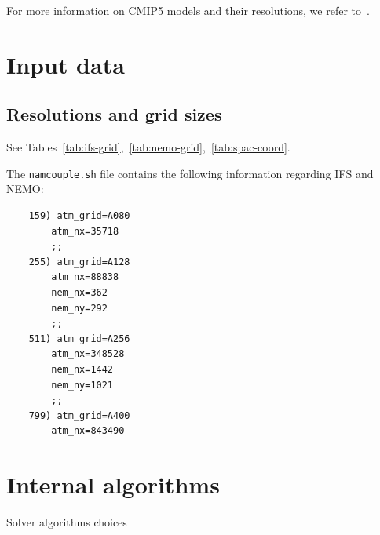For more information on CMIP5 models and their resolutions, we refer to~\cite{cmip5}.

\section{Input data}

\subsection{Resolutions and grid sizes}
See Tables~\ref{tab:ifs-grid},~\ref{tab:nemo-grid},~\ref{tab:spac-coord}.


The \texttt{namcouple.sh} file contains the following information regarding IFS and NEMO:

\begin{lstlisting}
    159) atm_grid=A080
        atm_nx=35718
        ;;
    255) atm_grid=A128
        atm_nx=88838
        nem_nx=362
        nem_ny=292
        ;;
    511) atm_grid=A256
        atm_nx=348528
        nem_nx=1442
        nem_ny=1021
        ;;
    799) atm_grid=A400
        atm_nx=843490  
\end{lstlisting}








\section{Internal algorithms}
Solver algorithms choices
